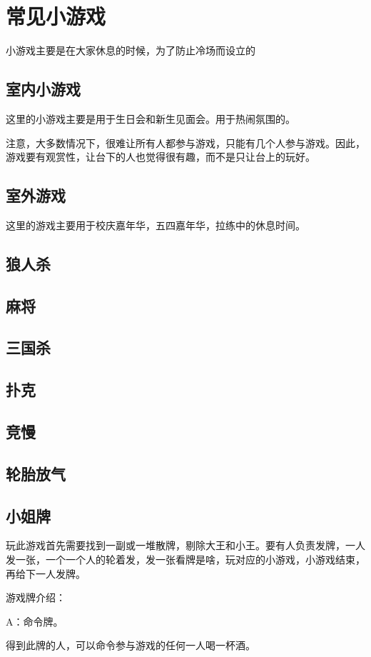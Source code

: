 \documentclass{ctexbook}
\begin{document}
\chapter{常见小游戏}
小游戏主要是在大家休息的时候，为了防止冷场而设立的
\section{室内小游戏}
这里的小游戏主要是用于生日会和新生见面会。用于热闹氛围的。

注意，大多数情况下，很难让所有人都参与游戏，只能有几个人参与游戏。因此，游戏要有观赏性，让台下的人也觉得很有趣，而不是只让台上的玩好。

\section{室外游戏}
这里的游戏主要用于校庆嘉年华，五四嘉年华，拉练中的休息时间。

\section{狼人杀}
\section{麻将}
\section{三国杀}
\section{扑克}
\section{竞慢}
\section{轮胎放气}
\section{小姐牌}

玩此游戏首先需要找到一副或一堆散牌，剔除大王和小王。要有人负责发牌，一人发一张，一个一个人的轮着发，发一张看牌是啥，玩对应的小游戏，小游戏结束，再给下一人发牌。


游戏牌介绍：

A：命令牌。

得到此牌的人，可以命令参与游戏的任何一人喝一杯酒。
\end{document}
